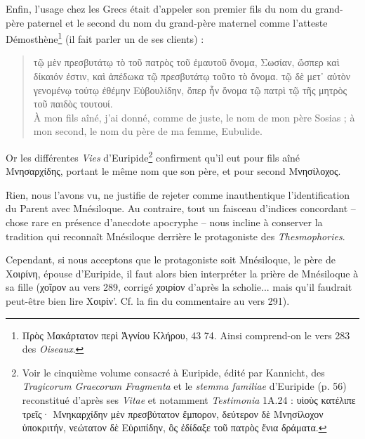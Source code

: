 \documentclass{book}%
\newcommand{\italique}[1]{\textit{#1}}%
\newcommand{\nieme}[1]{#1\italique{e}}%
\newcommand{\note}[1]{\footnote{#1}}
\newcommand{\citComm}[1]{\begin{quote}#1\end{quote}}
\begin{document}
Enfin, l'usage chez les Grecs était d'appeler son premier fils du nom du grand-père paternel et le second du nom du grand-père maternel comme l'atteste Démosthène\note{Πρὸς Μακάρτατον περὶ Ἁγνίου Κλήρου, 43 74. Ainsi comprend-on le vers 283 des \italique{Oiseaux}.} (il fait parler un de ses clients) :
\citComm{τῷ μὲν πρεσβυτάτῳ τὸ τοῦ πατρὸς τοῦ ἐμαυτοῦ ὄνομα, Σωσίαν, ὥσπερ καὶ δίκαιόν ἐστιν, καὶ ἀπέδωκα τῷ πρεσβυτάτῳ τοῦτο τὸ ὄνομα. τῷ δὲ μετ᾽ αὐτὸν γενομένῳ τούτῳ ἐθέμην Εὐβουλίδην, ὅπερ ἦν ὄνομα τῷ πατρὶ τῷ τῆς μητρὸς τοῦ παιδὸς τουτουί.\\
À mon fils aîné, j'ai donné, comme de juste, le nom de mon père Sosias ; à mon second, le nom du père de ma femme, Eubulide.}
Or les différentes \italique{Vies} d'Euripide\note{Voir le cinquième volume consacré à Euripide, édité par Kannicht, des \italique{Tragicorum Graecorum Fragmenta} et le \italique{stemma familiae} d'Euripide (p. 56) reconstitué d'après ses \italique{Vitae} et notamment \italique{Testimonia} 1A.24 : υἱοὺς κατέλιπε τρεῖς· Μνηκαρχίδην μὲν πρεσβύτατον ἔμπορον, δεύτερον δὲ Μνησίλοχον ὑποκριτήν, νεώτατον δὲ Εὐριπίδην, ὃς ἐδίδαξε τοῦ πατρὸς ἔνια δράματα.} confirment qu'il eut pour fils aîné Μνησαρχίδης, portant le même nom que son père, et pour second Μνησίλοχος.


Rien, nous l'avons vu, ne justifie de rejeter comme inauthentique l'identification du Parent avec Mnésiloque. Au contraire, tout un faisceau d'indices concordant -- chose rare en présence d'anecdote apocryphe -- nous incline à conserver la tradition qui reconnaît Mnésiloque derrière le protagoniste des \italique{Thesmophories}.

Cependant, si nous acceptons que le protagoniste soit Mnésiloque, le père de Χοιρίνη, épouse d'Euripide, il faut alors bien interpréter la prière de Mnésiloque à sa fille (χοῖρον au vers 289, corrigé χοιρίον d'après la scholie... mais qu'il faudrait peut-être bien lire Χοιρίν'. Cf. la fin du commentaire au vers 291).


\end{document}
